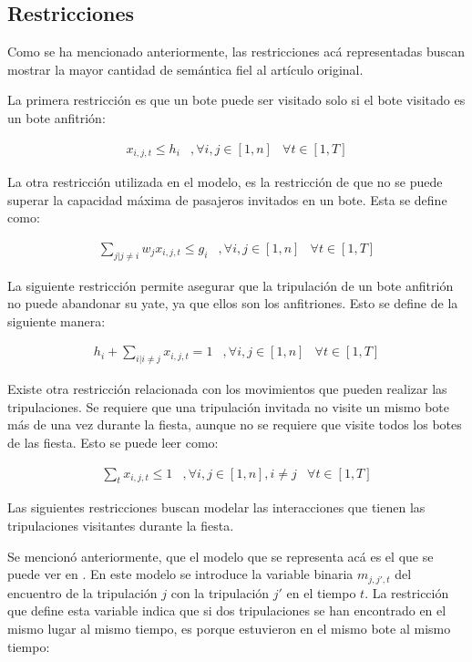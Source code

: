 \documentclass[letter, 10pt]{article}
\begin{document}
\subsection{Restricciones}
Como se ha mencionado anteriormente, las restricciones acá representadas buscan mostrar la mayor cantidad de semántica fiel al artículo original.

La primera restricción es que un bote puede ser visitado solo si el bote visitado es un bote anfitrión:

\begin{eqnarray}
x_{i,j,t} \leq h_i & , \forall i,j \in [1,n] & \forall t \in [1,T]
\end{eqnarray}

La otra restricción utilizada en el modelo, es la restricción de que no se puede superar la capacidad máxima de pasajeros invitados en un bote. Esta se define como:

\begin{eqnarray}
\sum_{j|j\neq i} w_jx_{i,j,t} \leq g_i & , \forall i,j \in [1,n] & \forall t \in [1,T]
\end{eqnarray}

La siguiente restricción permite asegurar que la tripulación de un bote anfitrión no puede abandonar su yate, ya que ellos son los anfitriones. Esto se define de la siguiente manera:

\begin{eqnarray}
h_i + \sum_{i|i\neq j}x_{i,j,t} = 1 & , \forall i,j \in [1,n] & \forall t \in [1,T]
\end{eqnarray}

Existe otra restricción relacionada con los movimientos que pueden realizar las tripulaciones. Se requiere que una tripulación invitada no visite un mismo bote más de una vez durante la fiesta, aunque no se requiere que visite todos los botes de las fiesta. Esto se puede leer como:

\begin{eqnarray}
\sum_tx_{i,j,t} \leq 1 & , \forall i,j \in [1,n], i \neq j & \forall t \in [1,T]
\end{eqnarray}

Las siguientes restricciones buscan modelar las interacciones que tienen las tripulaciones visitantes durante la fiesta.

Se mencionó anteriormente, que el modelo que se representa acá es el que se puede ver en \cite{PPPAsMIP}. En este modelo se introduce la variable binaria $m_{j,j',t}$ del encuentro de la tripulación $j$ con la tripulación $j'$ en el tiempo $t$. La restricción que define esta variable indica que si dos tripulaciones se han encontrado en el mismo lugar al mismo tiempo, es porque estuvieron en el mismo bote al mismo tiempo:
\end{document}
